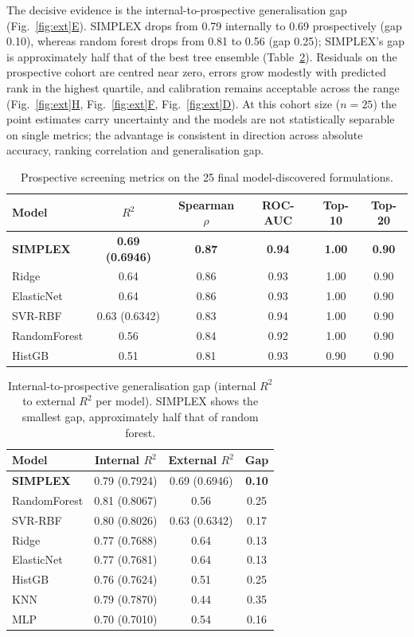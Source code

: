 \documentclass[utf8]{FrontiersinHarvard}
\newcommand{\Fref}[2]{Fig.~\hyperref[#1]{\ref{#1}#2}}
\newcommand{\Tref}[1]{Table~\hyperref[#1]{\ref{#1}}}
\begin{document}
The decisive evidence is the internal-to-prospective generalisation gap (\Fref{fig:ext}{E}). SIMPLEX drops from 0.79 internally to 0.69 prospectively (gap 0.10), whereas random forest drops from 0.81 to 0.56 (gap 0.25); SIMPLEX's gap is approximately half that of the best tree ensemble (\Tref{tab:gap}). Residuals on the prospective cohort are centred near zero, errors grow modestly with predicted rank in the highest quartile, and calibration remains acceptable across the range (\Fref{fig:ext}{H}, \Fref{fig:ext}{F}, \Fref{fig:ext}{D}). At this cohort size ($n = 25$) the point estimates carry uncertainty and the models are not statistically separable on single metrics; the advantage is consistent in direction across absolute accuracy, ranking correlation and generalisation gap.

\begin{table}[h]
\centering
\caption{Prospective screening metrics on the 25 final model-discovered formulations.}
\label{tab:ext}
\begin{tabular}{lccccc}
\toprule
Model & $R^2$ & Spearman $\rho$ & ROC-AUC & Top-10 & Top-20 \\
\midrule
\textbf{SIMPLEX} & \textbf{0.69 (0.6946)} & \textbf{0.87} & \textbf{0.94} & \textbf{1.00} & \textbf{0.90} \\
Ridge & 0.64 & 0.86 & 0.93 & 1.00 & 0.90 \\
ElasticNet & 0.64 & 0.86 & 0.93 & 1.00 & 0.90 \\
SVR-RBF & 0.63 (0.6342) & 0.83 & 0.94 & 1.00 & 0.90 \\
RandomForest & 0.56 & 0.84 & 0.92 & 1.00 & 0.90 \\
HistGB & 0.51 & 0.81 & 0.93 & 0.90 & 0.90 \\
\bottomrule
\end{tabular}
\end{table}

\begin{table}[h]
\centering
\caption{Internal-to-prospective generalisation gap (internal $R^2$ to external $R^2$ per model). SIMPLEX shows the smallest gap, approximately half that of random forest.}
\label{tab:gap}
\begin{tabular}{lccc}
\toprule
Model & Internal $R^2$ & External $R^2$ & Gap \\
\midrule
\textbf{SIMPLEX} & 0.79 (0.7924) & 0.69 (0.6946) & \textbf{0.10} \\
RandomForest & 0.81 (0.8067) & 0.56 & 0.25 \\
SVR-RBF & 0.80 (0.8026) & 0.63 (0.6342) & 0.17 \\
Ridge & 0.77 (0.7688) & 0.64 & 0.13 \\
ElasticNet & 0.77 (0.7681) & 0.64 & 0.13 \\
HistGB & 0.76 (0.7624) & 0.51 & 0.25 \\
KNN & 0.79 (0.7870) & 0.44 & 0.35 \\
MLP & 0.70 (0.7010) & 0.54 & 0.16 \\
\bottomrule
\end{tabular}
\end{table}
\end{document}
